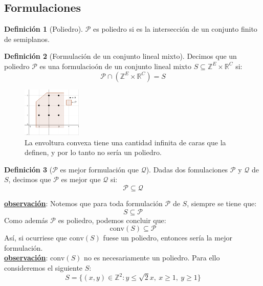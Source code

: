 \documentclass[10pt]{article}
\newcommand{\R}{\mathbb R}
\newcommand{\Z}{\mathbb Z}
\theoremstyle{plain}
\theoremstyle{definition}
\newtheorem{defi}{Definición}
\begin{document}
\subsection*{Formulaciones}
\begin{defi}[Poliedro]
$\mathcal{P}$ es poliedro si es la intersección de un conjunto finito de semiplanos.\\
\end{defi}
\begin{defi}[Formulación de un conjunto lineal mixto]
Decimos que un poliedro $\mathcal{P}$ es una formulacioón de un conjunto lineal mixto $S \subseteq \Z^E \times \R^C$ si:
$$
\mathcal{P} \cap (\Z^E \times \R^C) = S
$$
\begin{figure}[h]
\centering
\includegraphics[width=0.25\textwidth]{poliedro}
\caption{La envoltura convexa tiene una cantidad infinita de caras que la definen, y por lo tanto no sería un poliedro.}
\end{figure}
\end{defi}

\begin{defi}[$\mathcal{P}$ es mejor formulación que $\mathcal{Q}$]
Dadas dos fomulaciones $\mathcal{P}$ y $\mathcal{Q}$ de $S$, decimos que $\mathcal{P}$ es mejor que $\mathcal{Q}$ si:
$$
\mathcal{P} \subseteq \mathcal{Q}
$$
\end{defi}
\underline{\textbf{observación}}: Notemos que para toda formulación $\mathcal{P}$ de $S$, siempre se tiene que:
$$
S \subseteq \mathcal{P}
$$
Como además $\mathcal{P}$ es poliedro, podemos concluir que:
$$
\text{conv}(S) \subseteq \mathcal{P}
$$
Así, si ocurriese que $\text{conv}(S)$ fuese un poliedro, entonces sería la mejor formulación.\\

\underline{\textbf{observación}}: $\text{conv}(S)$ no es necesariamente un poliedro. Para ello consideremos el siguiente $S$:
$$
S = \{(x,y) \in \Z^2: y \leq \sqrt{2}x,\ x\geq 1,\ y\geq 1\}
$$
\end{document}
